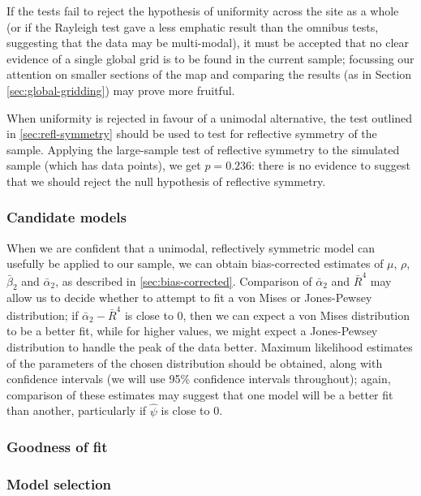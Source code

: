 \documentclass[../../ArchStats.tex]{subfiles}
\begin{document}
If the tests fail to reject the hypothesis of uniformity across the site as a whole (or if the Rayleigh test gave a less emphatic result than the omnibus tests, suggesting that the data may be multi-modal), it must be accepted that no clear evidence of a single global grid is to be found in the current sample; focussing our attention on smaller sections of the map and comparing the results (as in Section \ref{sec:global-gridding}) may prove more fruitful. 

When uniformity is rejected in favour of a unimodal alternative, the test outlined in \ref{sec:refl-symmetry} should be used to test for reflective symmetry of the sample. 
Applying the large-sample test of reflective symmetry to the simulated sample (which has  data points), we get $p = 0.236$: there is no evidence to suggest that we should reject the null hypothesis of reflective symmetry.

\subsubsection{Candidate models}

When we are confident that a unimodal, reflectively symmetric model can usefully be applied to our sample, we can obtain bias-corrected estimates of $\mu$, $\rho$, $\bar{\beta}_2$ and $\bar{\alpha}_2$, as described in \ref{sec:bias-corrected}. Comparison of $\bar{\alpha}_2$ and $\bar{R}^4$ may allow us to decide whether to attempt to fit a von Mises or Jones-Pewsey distribution; if $\bar{\alpha}_2 - \bar{R}^4$ is close to 0, then we can expect a von Mises distribution to be a better fit, while for higher values, we might expect a Jones-Pewsey distribution to handle the peak of the data better. Maximum likelihood estimates of the parameters of the chosen distribution should be obtained, along with confidence intervals (we will use 95\% confidence intervals throughout); again, comparison of these estimates may suggest that one model will be a better fit than another, particularly if $\hat{\psi}$ is close to 0.


\subsubsection{Goodness of fit}

\subsubsection{Model selection}
\end{document}
